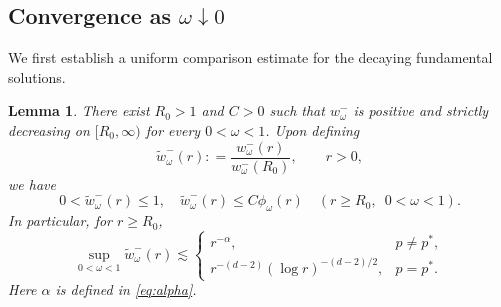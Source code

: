 \documentclass[12pt, a4paper, reqno]{amsart}
\numberwithin{equation}{section}
\newtheorem{lemma}[theorem]{Lemma}
\theoremstyle{definition}
\theoremstyle{remark}
\newcommand{\R}{\mathbb R}
\newcommand{\ce}{\mathrel{\mathop:}=}
\begin{document}
\subsection{Convergence as \texorpdfstring{$\omega\downarrow0$}{omega decreases to zero}}

We first establish a uniform comparison estimate for the decaying
fundamental solutions.
\begin{lemma}
\label{lem:wbound}
There exist $R_0>1$ and $C>0$ such that $w_\omega^-$ is positive and
strictly decreasing on $[R_0,\infty)$ for every $0<\omega<1$.
Upon defining
\[
  \widetilde w_\omega^-(r)
  \ce \frac{w_\omega^-(r)}{w_\omega^-(R_0)},
  \qquad r>0,
\]
we have
\begin{equation}\label{eq:w-unif}
  0<\widetilde w_\omega^-(r)\le1,
  \quad \widetilde w_\omega^-(r)\le C\phi_\omega(r)
  \quad (r\ge R_0,\enspace 0<\omega<1).
\end{equation}
In particular, for $r\ge R_0$,
\begin{equation}\label{eq:wdec}
  \sup_{0<\omega<1}\widetilde w_\omega^-(r)
  \lesssim
  \begin{cases}
    r^{-\alpha}, & p\ne p^*,\\[2pt]
    r^{-(d-2)}(\log r)^{-(d-2)/2}, & p=p^*.
  \end{cases}
\end{equation}
Here $\alpha$ is defined in \eqref{eq:alpha}.
\end{lemma}
\end{document}
